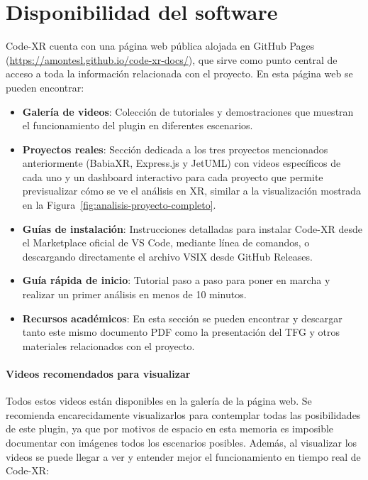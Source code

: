\documentclass[a4paper, 12pt]{book}
\begin{document}
\section{Disponibilidad del software}
\label{sec:disponibilidad-software}

Code-XR cuenta con una página web pública alojada en GitHub Pages (\url{https://amontesl.github.io/code-xr-docs/}), que sirve como punto central de acceso a toda la información relacionada con el proyecto. En esta página web se pueden encontrar:

\begin{itemize}
  \item \textbf{Galería de videos}: Colección de tutoriales y demostraciones que muestran el funcionamiento del plugin en diferentes escenarios.
  
  \item \textbf{Proyectos reales}: Sección dedicada a los tres proyectos mencionados anteriormente (BabiaXR, Express.js y JetUML) con videos específicos de cada uno y un dashboard interactivo para cada proyecto que permite previsualizar cómo se ve el análisis en XR, similar a la visualización mostrada en la Figura~\ref{fig:analisis-proyecto-completo}.
  
  \item \textbf{Guías de instalación}: Instrucciones detalladas para instalar Code-XR desde el Marketplace oficial de VS Code, mediante línea de comandos, o descargando directamente el archivo VSIX desde GitHub Releases.
  
  \item \textbf{Guía rápida de inicio}: Tutorial paso a paso para poner en marcha y realizar un primer análisis en menos de 10 minutos.
  
  \item \textbf{Recursos académicos}: En esta sección se pueden encontrar y descargar tanto este mismo documento PDF como la presentación del TFG y otros materiales relacionados con el proyecto.
\end{itemize}

\paragraph{Videos recomendados para visualizar}
Todos estos videos están disponibles en la galería de la página web. Se recomienda encarecidamente visualizarlos para contemplar todas las posibilidades de este plugin, ya que por motivos de espacio en esta memoria es imposible documentar con imágenes todos los escenarios posibles. Además, al visualizar los videos se puede llegar a ver y entender mejor el funcionamiento en tiempo real de Code-XR:
\end{document}
